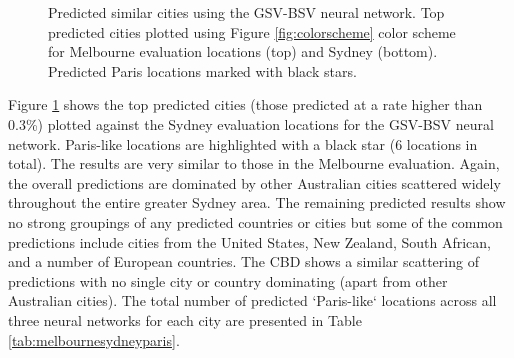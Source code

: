 \documentclass[sageh,times]{sagej}
\begin{document}
\begin{figure}[!htbp]
\caption{Predicted similar cities using the GSV-BSV neural network. Top predicted cities plotted using Figure \ref{fig:colorscheme} color scheme for Melbourne evaluation locations (top) and Sydney (bottom). Predicted Paris locations marked with black stars.}   
 \label{fig:melstreet}  
\end{figure} 


Figure \ref{fig:melstreet} shows the top predicted cities (those predicted at a rate higher than 0.3\%) plotted against the Sydney evaluation locations for the GSV-BSV neural network. Paris-like locations are highlighted with a black star (6 locations in total). The results are very similar to those in the Melbourne evaluation. Again, the overall predictions are dominated by other Australian cities scattered widely throughout the entire greater Sydney area. The remaining predicted results show no strong groupings of any predicted countries or cities but some of the common predictions include cities from the United States, New Zealand, South African, and a number of European countries. The CBD shows a similar scattering of predictions with no single city or country dominating (apart from other Australian cities). The total number of predicted `Paris-like` locations across all three neural networks for each city are presented in Table \ref{tab:melbournesydneyparis}.

\end{document}
